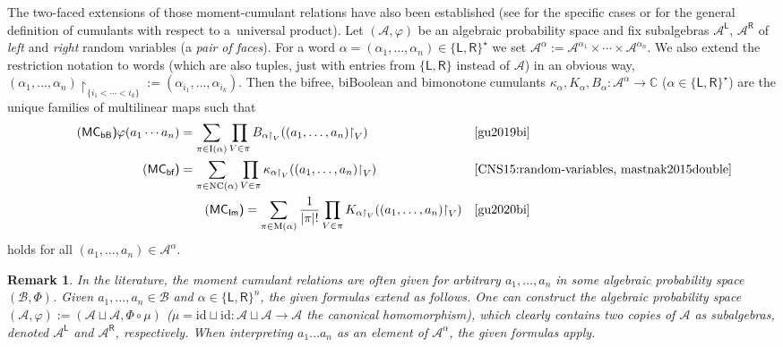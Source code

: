 \documentclass[pdftex]{sigma}
\renewcommand{\restriction}[2]{{#1\mathbin{\upharpoonright}_{#2}}}
\def\ibp{\mathrm{I}}
\def\bnc{\mathrm{NC}}
\def\mbnc{\mathrm{M}}
\newcommand\LL{{\mathsf{L}}}
\newcommand\RR{{\mathsf{R}}}
\def\CC{\mathbb{C}}
\numberwithin{equation}{section}
\newtheorem{Remark}[Theorem]{Remark}
\begin{document}
The two-faced extensions of those moment-cumulant relations have also been established (see \cite{CNS15:random-variables,gu2020bi, gu2019bi,mastnak2015double} for the specific cases or \cite{ManzelSchurmann17} for the general definition of cumulants with respect to a~universal product). Let $(\mathcal A,\varphi)$ be an algebraic probability space and fix subalgebras $\mathcal A^{\LL}$, $\mathcal A^{\RR}$ of \emph{left} and \emph{right} random variables (a \emph{pair of faces}).
For a word $\alpha=(\alpha_1,\dots, \alpha_n)\in \{\LL,\RR\}^\star$ we set $\mathcal A^\alpha:=\mathcal A^{\alpha_1}\times \cdots \times \mathcal A^{\alpha_n}$.
We also extend the restriction notation to words (which are also tuples, just with entries from $\{\LL,\RR\}$ instead of $\mathcal A$) in an obvious way, $\restriction{(\alpha_1,\dots,\alpha_n)}{\{i_1<\cdots<i_k\}}:=(\alpha_{i_1},\dots,\alpha_{i_k})$. Then the bifree, biBoolean and bimonotone cumulants $\kappa_\alpha,K_\alpha,B_\alpha\colon \mathcal A^\alpha\to\CC$ ($\alpha\in \{\LL,\RR\}^\star$) are the unique families of multilinear maps such that
\begin{align}
	\label{eqn:mcrbB}
	\tag{\sf MC$_{\text{bB}}$} \varphi(a_1\cdots a_n) & = \sum_{\pi \in \ibp(\alpha)}\prod_{V \in \pi} B_{\restriction{\alpha}{ V}}(\restriction{(a_1,\dots,a_n)}{V}) & & \text{\cite{gu2019bi}} \\
	\label{eqn:mcrbf}
	\tag{\sf MC$_{\text{bf}}$}
	 & = \sum_{\pi \in \bnc(\alpha)}\prod_{V \in \pi} \kappa_{\restriction{\alpha}{ V}}(\restriction{(a_1,\dots,a_n)}{V}) & & \text{\cite{CNS15:random-variables, mastnak2015double}} \\
	\label{eqn:mcrm}
	 & \tag{\sf MC$_{\text{Im}}$} = \sum_{\pi \in \mbnc(\alpha)}\frac{1}{|\pi|!}\prod_{V \in \pi} K_{\restriction{\alpha}{ V}}(\restriction{(a_1,\dots,a_n)}{V}) & & \text{\cite{gu2020bi}}
\end{align}
holds for all $(a_1,\dots, a_n)\in \mathcal A^\alpha$.

\begin{Remark}
 In the literature, the moment cumulant relations are often given for arbitrary $a_1,\dots, a_n$ in some algebraic probability space $(\mathcal B,\Phi)$. Given $a_1,\dots, a_n\in \mathcal B$ and $\alpha\in \{\LL,\RR\}^n$, the given formulas extend as follows. One can construct the algebraic probability space $(\mathcal A,\varphi):=(\mathcal A\sqcup \mathcal A, \Phi\circ\mu)$ ($\mu=\mathrm{id}\sqcup\mathrm{id}\colon \mathcal A\sqcup \mathcal A \to \mathcal A$ the canonical homomorphism), which clearly contains two copies of $\mathcal A$ as subalgebras, denoted $\mathcal A^\LL$ and $\mathcal A^\RR$, respectively. When interpreting $a_1\dots a_n$ as an element of $\mathcal A^\alpha$, the given formulas apply.
\end{Remark}
\end{document}
